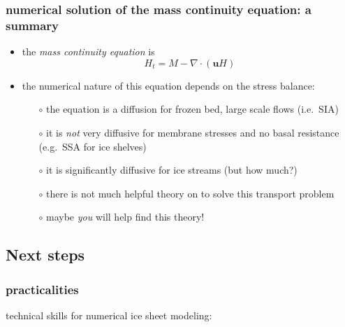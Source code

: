 \documentclass[titlepage,letterpaper,final,12pt]{scrartcl}
\begin{document}
\subsubsection*{numerical solution of the mass continuity equation: a summary}

\begin{itemize}
\item the \emph{mass continuity equation} is
  $$H_t = M - \nabla \cdot (\mathbf{u} H)$$
\item the numerical nature of this equation depends on the stress balance:
  \begin{itemize}
  \item[$\circ$] the equation is a diffusion for frozen bed, large scale flows (i.e.~SIA)
  \item[$\circ$] it is \emph{not} very diffusive for membrane stresses and no basal resistance (e.g.~SSA for ice shelves)
  \item[$\circ$] it is significantly diffusive for ice streams (but how much?)
  \item[$\circ$] there is not much helpful theory on to solve this transport problem
  \item[$\circ$] maybe \emph{you} will help find this theory!
  \end{itemize}
\end{itemize}


\subsection{Next steps}

\subsubsection*{practicalities}

technical skills for numerical ice sheet modeling:
\end{document}
